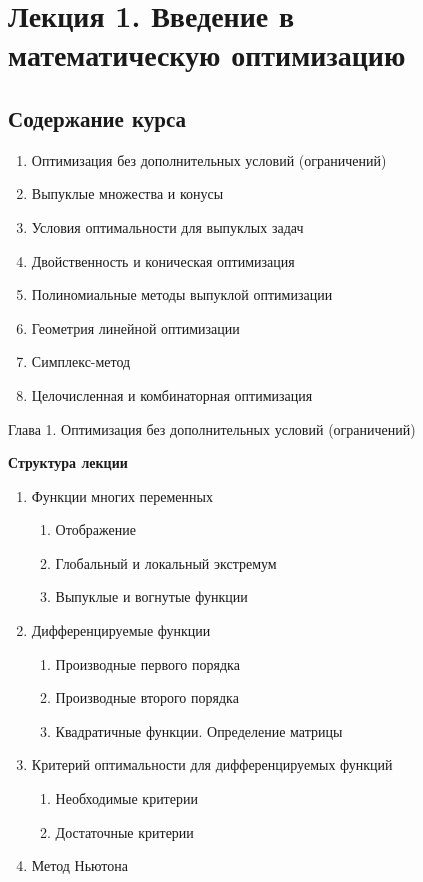 \section{Лекция 1. Введение в математическую оптимизацию}
\subsection{Содержание курса}
\begin{enumerate}
\item Оптимизация без дополнительных условий (ограничений)
\item Выпуклые множества и конусы
\item Условия оптимальности для выпуклых задач
\item Двойственность и коническая оптимизация
\item Полиномиальные методы выпуклой оптимизации
\item Геометрия линейной оптимизации
\item Симплекс-метод
\item Целочисленная и комбинаторная оптимизация
\end{enumerate}
\newpage
\begin{large}
Глава 1. Оптимизация без дополнительных условий (ограничений)
\end{large}
\vspace{.5 cm}
\begin{center}
\textbf{Структура лекции}
\end{center}

\begin{enumerate}
\item{Функции многих переменных
\begin{enumerate}
\item Отображение
\item Глобальный и локальный экстремум
\item Выпуклые и вогнутые функции
\end{enumerate}
}
\item{Дифференцируемые функции
\begin{enumerate}
\item Производные первого порядка
\item Производные второго порядка
\item Квадратичные функции. Определение матрицы
\end{enumerate}
}
\item{ Критерий оптимальности для дифференцируемых функций
\begin{enumerate}
\item Необходимые критерии
\item Достаточные критерии
\end{enumerate}
}
\item Метод Ньютона
\end{enumerate}
\newpage
